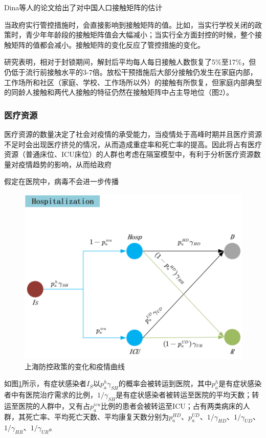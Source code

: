\documentclass[bwprint]{gmcmthesis}
\numberwithin{figure}{section}
\begin{document}
Dina等人的论文给出了对中国人口接触矩阵的估计
\par 当政府实行管控措施时，会直接影响到接触矩阵的值。比如，当实行学校关闭的政策时，青少年年龄段的接触矩阵值会大幅减小；当实行全方面封控的时候，整个接触矩阵的值都会减小。接触矩阵的变化反应了管控措施的变化。
\par 研究表明，相对于封锁期间，解封后平均每人每日接触人数恢复了5\%至17\%，但仍低于流行前接触水平的3-7倍。放松干预措施后大部分接触仍发生在家庭内部，工作场所和社区（家庭、学校、工作场所以外）的接触有所恢复，但家庭内部典型的同龄人接触和两代人接触的特征仍然在接触矩阵中占主导地位（图2）。
\subsubsection{医疗资源}
医疗资源的数量决定了社会对疫情的承受能力，当疫情处于高峰时期并且医疗资源不足时会出现医疗挤兑的情况，从而造成重症率和死亡率的提高。因此将占有医疗资源（普通床位、ICU床位）的人群也考虑在隔室模型中，有利于分析医疗资源数量对疫情趋势的影响，从而给政府
\par 假定在医院中，病毒不会进一步传播
\begin{figure}[!h]
\centering
\includegraphics[width=.75\textwidth]{hospital.png}
\caption{上海防控政策的变化和疫情曲线}
\label{hos}
\end{figure}
如图\ref{hos}所示，有症状感染者$I_S$以$p_a^h\gamma_{SH}$的概率会被转运到医院，其中$p_a^h$是有症状感染者中有医院治疗需求的比例，$1/\gamma_{SH}$是有症状感染者被转运至医院的平均天数；转运至医院的人群中，又有占$p_a^{icu}$比例的患者会被转运至ICU；占有两类病床的人群，其死亡率、平均死亡天数、平均康复天数分别为$p_a^{HD}$、$p_a^{UD}$、$1/\gamma_{HD}$、$1/\gamma_{UD}$、$1/\gamma_{HR}$、$1/\gamma_{UR}$。
\end{document}

